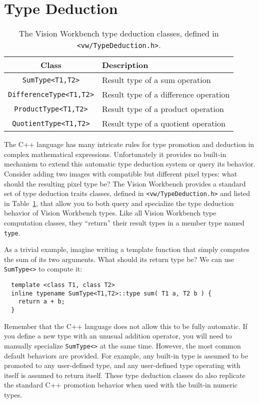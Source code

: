 \section{Type Deduction}

\begin{table}[t]\begin{centering}
\begin{tabular}{|c|l|} \hline
Class & Description \\ \hline \hline
\verb#SumType<T1,T2># & Result type of a sum operation \\ \hline
\verb#DifferenceType<T1,T2># & Result type of a difference operation \\ \hline
\verb#ProductType<T1,T2># & Result type of a product operation \\ \hline
\verb#QuotientType<T1,T2># & Result type of a quotient operation \\ \hline
\end{tabular}
\caption{The Vision Workbench type deduction classes, defined in {\tt <vw/TypeDeduction.h>}.}
\label{tbl:type-deduction}
\end{centering}\end{table}

The C++ language has many intricate rules for type promotion and
deduction in complex mathematical expressions.  Unfortunately it
provides no built-in mechanism to extend this automatic type deduction
system or query its behavior.  Consider adding two images with 
compatible but different pixel types: what should the resulting 
pixel type be?  The Vision Workbench provides a standard set of type 
deduction traits classes, defined in \verb#<vw/TypeDeduction.h># and 
listed in Table~\ref{tbl:type-deduction}, that allow you to both query 
and specialize the type deduction behavior of Vision Workbench types.  
Like all Vision Workbench type computation classes, they ``return'' 
their result types in a member type named \verb#type#.

As a trivial example, imagine writing a template function that simply 
computes the sum of its two arguments.  What should its return type 
be?  We can use \verb#SumType<># to compute it:
\begin{verbatim}
  template <class T1, class T2>
  inline typename SumType<T1,T2>::type sum( T1 a, T2 b ) {
    return a + b;
  }
\end{verbatim}
Remember that the C++ language does not allow this to be fully
automatic.  If you define a new type with an unusual addition
operator, you will need to manually specialize \verb#SumType<># at the
same time.  However, the most common default behaviors are provided.
For example, any built-in type is assumed to be promoted to any
user-defined type, and any user-defined type operating with itself is
assumed to return itself.  These type deduction classes do also
replicate the standard C++ promotion behavior when used with the
built-in numeric types.

